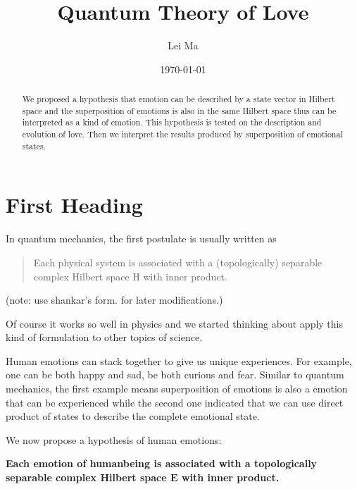 \documentclass[%
 aip,
 jmp,%
 amsmath,amssymb,
 reprint,%
]{revtex4-1}
\begin{document}

\title[Quantum Theory of Love]{Quantum Theory of Love}%


\author{Lei Ma}%
%

\date{\today}%

\begin{abstract}
We proposed a hypothesis that emotion can be described by a state vector in Hilbert space and the superposition of emotions is also in the same Hilbert space thus can be interpreted as a kind of emotion. This hypothesis is tested on the description and evolution of love. Then we interpret the results produced by superposition of emotional states. 
\end{abstract}

\maketitle



\section{First Heading}

In quantum mechanics, the first postulate is usually written as

\begin{quote}
Each physical system is associated with a (topologically) separable complex Hilbert space H with inner product.
\end{quote}

(note: use shankar's form. for later modifications.)


Of course it works so well in physics and we started thinking about apply this kind of formulation to other topics of science.

Human emotions can stack together to give us unique experiences. For example, one can be both happy and sad, be both curious and fear. Similar to quantum mechanics, the first example means superposition of emotions is also a emotion that can be experienced while the second one indicated that we can use direct product of states to describe the complete emotional state.

We now propose a hypothesis of human emotions:

\bf{
Each emotion of humanbeing is associated with a topologically separable complex Hilbert space $\mathbf E$ with inner product.
}
\end{document}
